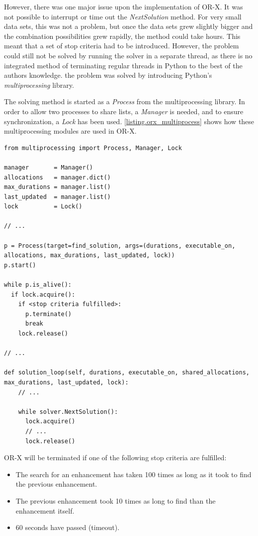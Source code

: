 However, there was one major issue upon the implementation of OR-X. It was not possible to interrupt or time out the \emph{NextSolution} method. For very small data sets, this was not a problem, but once the data sets grew slightly bigger and the combination possibilities grew rapidly, the method could take hours. This meant that a set of stop criteria had to be introduced. However, the problem could still not be solved by running the solver in a separate thread, as there is no integrated method of terminating regular threads in Python to the best of the authors knowledge. the problem was solved by introducing Python's \emph{multiprocessing} library.

The solving method is started as a \emph{Process} from the multiprocessing library. In order to allow two processes to share lists, a \emph{Manager} is needed, and to ensure synchronization, a \emph{Lock} has been used. \lstlistingname \space \ref{listing.orx_multiprocess} shows how these multiprocessing modules are used in OR-X.

\vspace{4mm}
\begin{lstlisting}[caption=OR-X Multiprocessing, label={listing.orx_multiprocess}]
from multiprocessing import Process, Manager, Lock

manager       = Manager()
allocations   = manager.dict()
max_durations = manager.list()
last_updated  = manager.list()
lock          = Lock()

// ...

p = Process(target=find_solution, args=(durations, executable_on, allocations, max_durations, last_updated, lock))
p.start()

while p.is_alive():
  if lock.acquire():
    if <stop criteria fulfilled>:
      p.terminate()
      break
    lock.release()

// ...

def solution_loop(self, durations, executable_on, shared_allocations, max_durations, last_updated, lock):
    // ...
    
    while solver.NextSolution():
      lock.acquire()
      // ...
      lock.release()
\end{lstlisting}

\noindent OR-X will be terminated if one of the following stop criteria are fulfilled:

\begin{itemize}
    \item The search for an enhancement has taken 100 times as long as it took to find the previous enhancement.
    \item The previous enhancement took 10 times as long to find than the enhancement itself.
    \item 60 seconds have passed (timeout).
\end{itemize}







